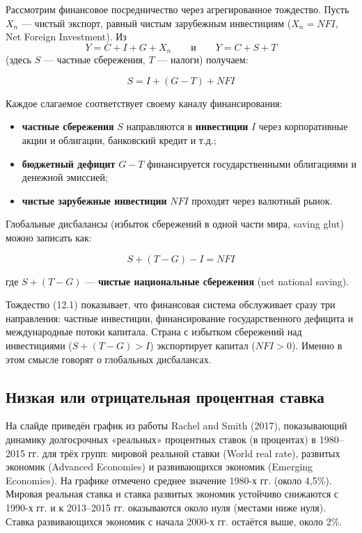 \documentclass[10pt,a4paper]{article}
\begin{document}
Рассмотрим финансовое посредничество через агрегированное тождество. Пусть $X_n$ — чистый экспорт, равный чистым зарубежным инвестициям ($X_n=NFI$, Net Foreign Investment). Из
$$Y=C+I+G+X_n \qquad\text{и}\qquad Y=C+S+T$$
(здесь $S$ — частные сбережения, $T$ — налоги) получаем:
\begin{formulabox}
\begin{equation}
S = I + (G-T) + NFI \tag{12.1}
\end{equation}
\end{formulabox}

Каждое слагаемое соответствует своему каналу финансирования:
\begin{itemize}[leftmargin=1.3em]
\item \textbf{частные сбережения} $S$ направляются в \textbf{инвестиции} $I$ через корпоративные акции и облигации, банковский кредит и т.д.;
\item \textbf{бюджетный дефицит} $G-T$ финансируется государственными облигациями и денежной эмиссией;
\item \textbf{чистые зарубежные инвестиции} $NFI$ проходят через валютный рынок.
\end{itemize}

Глобальные дисбалансы (избыток сбережений в одной части мира, saving glut) можно записать как:
\begin{formulabox}
\begin{equation}
S + (T-G) - I = NFI \tag{12.2}
\end{equation}
\end{formulabox}
где $S+(T-G)$ — \textbf{чистые национальные сбережения} (net national saving).

\begin{intuition}
Тождество (12.1) показывает, что финансовая система обслуживает сразу три направления: частные инвестиции, финансирование государственного дефицита и международные потоки капитала. Страна с избытком сбережений над инвестициями ($S+(T-G)>I$) экспортирует капитал ($NFI>0$). Именно в этом смысле говорят о глобальных дисбалансах.
\end{intuition}

\subsection{Низкая или отрицательная процентная ставка}

На слайде приведён график из работы Rachel and Smith (2017), показывающий динамику долгосрочных «реальных» процентных ставок (в процентах) в 1980--2015 гг. для трёх групп: мировой реальной ставки (World real rate), развитых экономик (Advanced Economies) и развивающихся экономик (Emerging Economies). На графике отмечено среднее значение 1980-х гг. (около 4,5\%). Мировая реальная ставка и ставка развитых экономик устойчиво снижаются с 1990-х гг. и к 2013--2015 гг. оказываются около нуля (местами ниже нуля). Ставка развивающихся экономик с начала 2000-х гг. остаётся выше, около 2\%.
\end{document}
